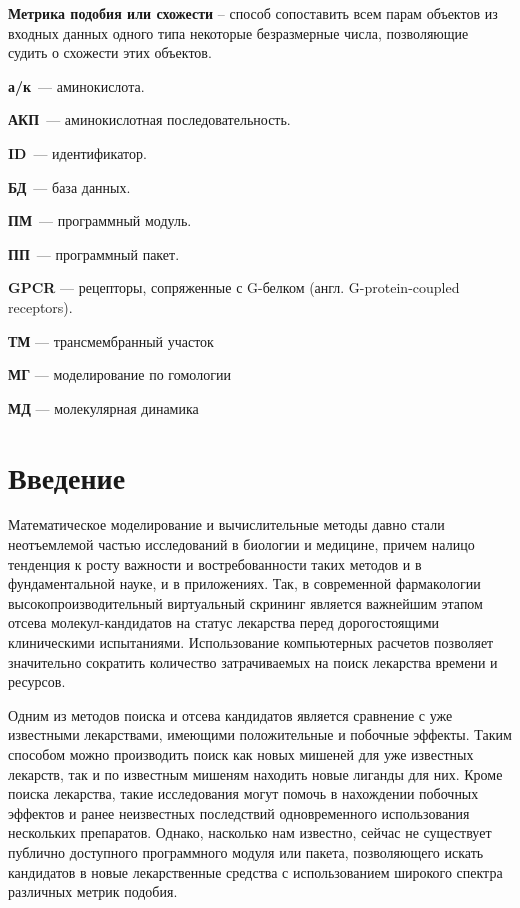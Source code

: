 \documentclass[a4paper,14pt]{article}         %
\begin{document}
\textbf{Метрика подобия или схожести} -- способ сопоставить всем парам объектов из входных данных одного типа некоторые безразмерные числа, позволяющие судить о схожести этих объектов.

\textbf{а/к}~--- аминокислота.

\textbf{АКП}~--- аминокислотная последовательность.

\textbf{ID}~--- идентификатор.

\textbf{БД}~--- база данных.

\textbf{ПМ}~--- программный модуль.

\textbf{ПП}~--- программный пакет.


\textbf{GPCR} --- рецепторы, сопряженные с G-белком (англ. G-protein-coupled receptors).

\color{gray}
\textbf{ТМ} --- трансмембранный участок

\textbf{МГ} --- моделирование по гомологии

\textbf{МД} --- молекулярная динамика
\color{black}

\newpage
\section{Введение}
Математическое моделирование и вычислительные методы давно стали неотъемлемой частью исследований в биологии и медицине, причем налицо тенденция к росту важности и востребованности таких методов и в фундаментальной науке, и в приложениях. Так, в современной фармакологии высокопроизводительный виртуальный скрининг является важнейшим этапом отсева молекул-кандидатов на статус лекарства перед дорогостоящими клиническими испытаниями. Использование компьютерных расчетов позволяет значительно сократить количество затрачиваемых на поиск лекарства времени и ресурсов.

Одним из методов поиска и отсева кандидатов является сравнение с уже известными лекарствами, имеющими положительные и побочные эффекты. Таким способом можно производить поиск как новых мишеней для уже известных лекарств, так и по известным мишеням находить новые лиганды для них. Кроме поиска лекарства, такие исследования могут помочь в нахождении побочных эффектов и ранее неизвестных последствий одновременного использования нескольких препаратов. Однако, насколько нам известно, сейчас не существует публично доступного программного модуля или пакета, позволяющего искать кандидатов в новые лекарственные средства с использованием широкого спектра различных метрик подобия.
\end{document}
